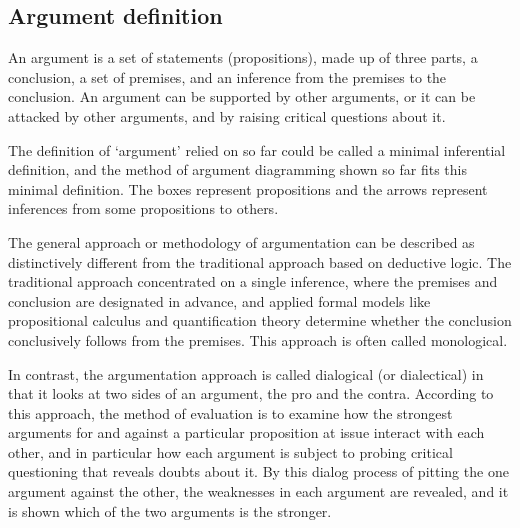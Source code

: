 \documentclass[lnbip]{svmultln}
\begin{document}
\subsection{Argument definition}
\par
An argument is a set of statements (propositions), made up of three parts, a conclusion, a set of premises, and an inference from the premises to the conclusion. An argument can be supported by other arguments, or it can be attacked by other arguments, and by raising critical questions about it.
\par
The definition of `argument' relied on so far could be called a minimal inferential definition, and the method of argument diagramming shown so far fits this minimal definition. The boxes represent propositions and the arrows represent inferences from some propositions to others.
\par
The general approach or methodology of argumentation can be described as distinctively different from the traditional approach based on deductive logic. The traditional approach concentrated on a single inference, where the premises and conclusion are designated in advance, and applied formal models like propositional
calculus and quantification theory determine whether the conclusion conclusively follows from the premises. This approach is often called monological.
\par
In contrast, the argumentation approach is called dialogical (or dialectical) in that it looks at two sides of an argument, the pro and the contra. According to this approach, the method of evaluation is to examine how the strongest arguments for and against a particular proposition at issue interact with each other, and in particular how each argument is subject to probing critical questioning that reveals doubts about it. By this dialog process of pitting the one argument against the other, the weaknesses in each argument are revealed, and it is shown which of the two arguments is the stronger.
\end{document}
